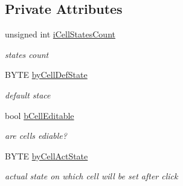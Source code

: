\subsection*{Private Attributes}
\begin{DoxyCompactItemize}
\item 
\hypertarget{classCGraphicsItemConfig_af26b418b41f28c670cc72b355f2a02dd}{
unsigned int \hyperlink{classCGraphicsItemConfig_af26b418b41f28c670cc72b355f2a02dd}{iCellStatesCount}}
\label{classCGraphicsItemConfig_af26b418b41f28c670cc72b355f2a02dd}

\begin{DoxyCompactList}\small\item\em states count \item\end{DoxyCompactList}\item 
\hypertarget{classCGraphicsItemConfig_ae5e62556101a5b1dad97a01e37805a62}{
BYTE \hyperlink{classCGraphicsItemConfig_ae5e62556101a5b1dad97a01e37805a62}{byCellDefState}}
\label{classCGraphicsItemConfig_ae5e62556101a5b1dad97a01e37805a62}

\begin{DoxyCompactList}\small\item\em default stace \item\end{DoxyCompactList}\item 
\hypertarget{classCGraphicsItemConfig_a5f1dfa338fc7832b2ca0ee14d415258e}{
bool \hyperlink{classCGraphicsItemConfig_a5f1dfa338fc7832b2ca0ee14d415258e}{bCellEditable}}
\label{classCGraphicsItemConfig_a5f1dfa338fc7832b2ca0ee14d415258e}

\begin{DoxyCompactList}\small\item\em are cells ediable? \item\end{DoxyCompactList}\item 
\hypertarget{classCGraphicsItemConfig_a1c2bcb2d69814c90f508236748151a86}{
BYTE \hyperlink{classCGraphicsItemConfig_a1c2bcb2d69814c90f508236748151a86}{byCellActState}}
\label{classCGraphicsItemConfig_a1c2bcb2d69814c90f508236748151a86}

\begin{DoxyCompactList}\small\item\em actual state on which cell will be set after click \item\end{DoxyCompactList}\end{DoxyCompactItemize}


